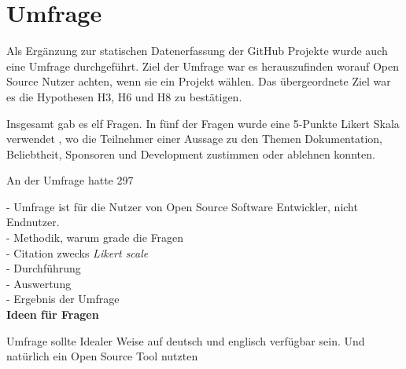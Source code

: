 \chapter{Umfrage}


Als Ergänzung zur statischen Datenerfassung der GitHub Projekte wurde auch eine Umfrage durchgeführt.
Ziel der Umfrage war es herauszufinden worauf Open Source Nutzer achten, wenn sie ein Projekt wählen.
Das übergeordnete Ziel war es die Hypothesen H3, H6 und H8 zu bestätigen. 

Insgesamt gab es elf Fragen. In fünf der Fragen wurde eine 5-Punkte Likert Skala verwendet 
\cite{likertScale}, wo die Teilnehmer einer Aussage zu den Themen Dokumentation, Beliebtheit, Sponsoren
und Development zustimmen oder ablehnen konnten. 



An der Umfrage hatte 297







- Umfrage ist für die Nutzer von Open Source Software Entwickler, nicht Endnutzer. \\
- Methodik, warum grade die Fragen \\
- Citation zwecks \textit{Likert scale} \\
- Durchführung \\
- Auswertung \\
- Ergebnis der Umfrage \\

{\huge\textbf{Ideen für Fragen}}

Umfrage sollte Idealer Weise auf deutsch und englisch verfügbar sein.
Und natürlich ein Open Source Tool nutzten

